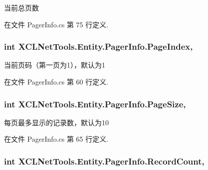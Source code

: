 当前总页数 



在文件 Pager\-Info.\-cs 第 75 行定义.

\hypertarget{class_x_c_l_net_tools_1_1_entity_1_1_pager_info_a2cd0abb6744c59bbd9b98c758a023ac5}{
\subsubsection[{Page\-Index}]{\setlength{\rightskip}{0pt plus 5cm}int X\-C\-L\-Net\-Tools.\-Entity.\-Pager\-Info.\-Page\-Index\hspace{0.3cm}{\ttfamily [get]}, {\ttfamily [set]}}}\label{class_x_c_l_net_tools_1_1_entity_1_1_pager_info_a2cd0abb6744c59bbd9b98c758a023ac5}


当前页码（第一页为1），默认为1 



在文件 Pager\-Info.\-cs 第 60 行定义.

\hypertarget{class_x_c_l_net_tools_1_1_entity_1_1_pager_info_af9b5f737263571d79ead065f6faaa5ca}{
\subsubsection[{Page\-Size}]{\setlength{\rightskip}{0pt plus 5cm}int X\-C\-L\-Net\-Tools.\-Entity.\-Pager\-Info.\-Page\-Size\hspace{0.3cm}{\ttfamily [get]}, {\ttfamily [set]}}}\label{class_x_c_l_net_tools_1_1_entity_1_1_pager_info_af9b5f737263571d79ead065f6faaa5ca}


每页最多显示的记录数，默认为10 



在文件 Pager\-Info.\-cs 第 65 行定义.

\hypertarget{class_x_c_l_net_tools_1_1_entity_1_1_pager_info_a5617d4aaafa80fa664f13cfe7fbc1a6c}{
\subsubsection[{Record\-Count}]{\setlength{\rightskip}{0pt plus 5cm}int X\-C\-L\-Net\-Tools.\-Entity.\-Pager\-Info.\-Record\-Count\hspace{0.3cm}{\ttfamily [get]}, {\ttfamily [set]}}}\label{class_x_c_l_net_tools_1_1_entity_1_1_pager_info_a5617d4aaafa80fa664f13cfe7fbc1a6c}


